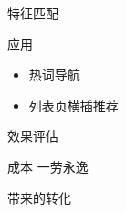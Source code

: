 \documentclass{beamer}
\begin{document}
\begin{CJK}{UTF8}{gbsn}
\begin{frame}{特征匹配}
\end{frame}


\begin{frame}{应用}
  \begin{itemize}
  \item {热词导航}
  \item {列表页横插推荐}
  \end{itemize}
\end{frame}

\begin{frame}{效果评估}
  \begin{block}{成本}
    一劳永逸
  \end{block}

  \begin{block}{带来的转化}
  \end{block}

\end{frame}


\end{CJK}
\end{document}
